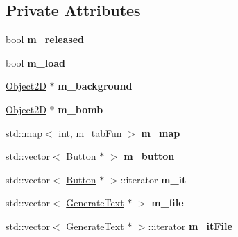\subsection*{Private Attributes}
\begin{DoxyCompactItemize}
\item 
\hypertarget{class_save_state_a198cb22131766e257aec7a11bd80573a}{}bool {\bfseries m\+\_\+released}\label{class_save_state_a198cb22131766e257aec7a11bd80573a}

\item 
\hypertarget{class_save_state_aca66dbf064079651a81e6a0a17bdc1fb}{}bool {\bfseries m\+\_\+load}\label{class_save_state_aca66dbf064079651a81e6a0a17bdc1fb}

\item 
\hypertarget{class_save_state_a228fd35cc16a6970221001cd5df67962}{}\hyperlink{class_object2_d}{Object2\+D} $\ast$ {\bfseries m\+\_\+background}\label{class_save_state_a228fd35cc16a6970221001cd5df67962}

\item 
\hypertarget{class_save_state_a4647fb336ff3abe6cff819c11517aae3}{}\hyperlink{class_object2_d}{Object2\+D} $\ast$ {\bfseries m\+\_\+bomb}\label{class_save_state_a4647fb336ff3abe6cff819c11517aae3}

\item 
\hypertarget{class_save_state_a5674f9b9e18417f489f7baad80e288be}{}std\+::map$<$ int, m\+\_\+tab\+Fun $>$ {\bfseries m\+\_\+map}\label{class_save_state_a5674f9b9e18417f489f7baad80e288be}

\item 
\hypertarget{class_save_state_addd62aedb298a416ca34696f265eb84e}{}std\+::vector$<$ \hyperlink{class_button}{Button} $\ast$ $>$ {\bfseries m\+\_\+button}\label{class_save_state_addd62aedb298a416ca34696f265eb84e}

\item 
\hypertarget{class_save_state_a9cf1c208603c2f30987bd8f39730323b}{}std\+::vector$<$ \hyperlink{class_button}{Button} $\ast$ $>$\+::iterator {\bfseries m\+\_\+it}\label{class_save_state_a9cf1c208603c2f30987bd8f39730323b}

\item 
\hypertarget{class_save_state_a89596c79603692fe3b60ce536929fffc}{}std\+::vector$<$ \hyperlink{class_generate_text}{Generate\+Text} $\ast$ $>$ {\bfseries m\+\_\+file}\label{class_save_state_a89596c79603692fe3b60ce536929fffc}

\item 
\hypertarget{class_save_state_a4923ac1fbe80e30e0e5a136e6bfd8481}{}std\+::vector$<$ \hyperlink{class_generate_text}{Generate\+Text} $\ast$ $>$\+::iterator {\bfseries m\+\_\+it\+File}\label{class_save_state_a4923ac1fbe80e30e0e5a136e6bfd8481}

\end{DoxyCompactItemize}
